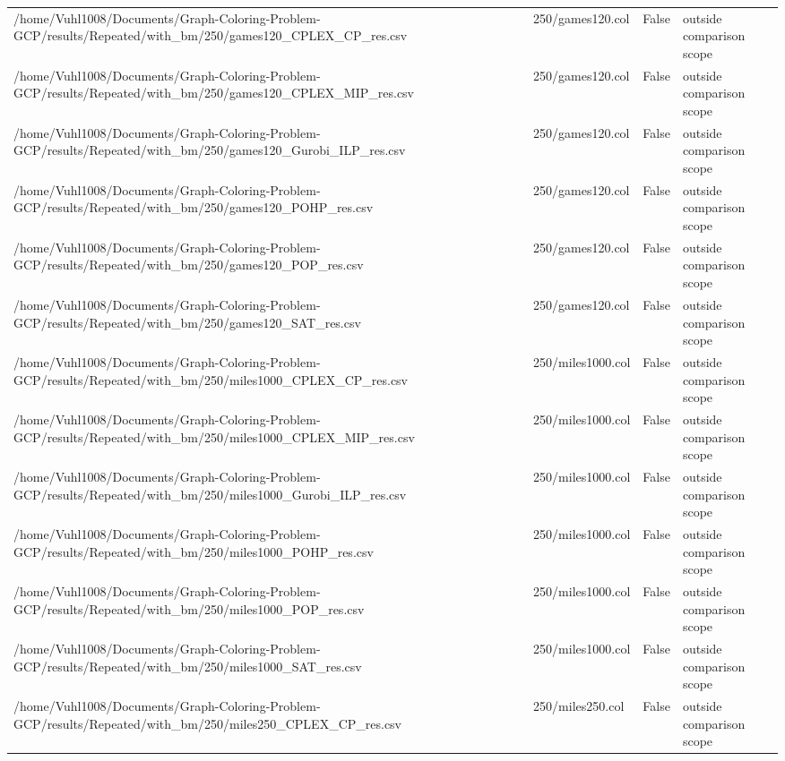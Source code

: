 \begin{table}[htbp]
\begin{tabular}{llll}
/home/Vuhl1008/Documents/Graph-Coloring-Problem-GCP/results/Repeated/with\_bm/250/games120\_CPLEX\_CP\_res.csv & 250/games120.col & False & outside comparison scope \\
/home/Vuhl1008/Documents/Graph-Coloring-Problem-GCP/results/Repeated/with\_bm/250/games120\_CPLEX\_MIP\_res.csv & 250/games120.col & False & outside comparison scope \\
/home/Vuhl1008/Documents/Graph-Coloring-Problem-GCP/results/Repeated/with\_bm/250/games120\_Gurobi\_ILP\_res.csv & 250/games120.col & False & outside comparison scope \\
/home/Vuhl1008/Documents/Graph-Coloring-Problem-GCP/results/Repeated/with\_bm/250/games120\_POHP\_res.csv & 250/games120.col & False & outside comparison scope \\
/home/Vuhl1008/Documents/Graph-Coloring-Problem-GCP/results/Repeated/with\_bm/250/games120\_POP\_res.csv & 250/games120.col & False & outside comparison scope \\
/home/Vuhl1008/Documents/Graph-Coloring-Problem-GCP/results/Repeated/with\_bm/250/games120\_SAT\_res.csv & 250/games120.col & False & outside comparison scope \\
/home/Vuhl1008/Documents/Graph-Coloring-Problem-GCP/results/Repeated/with\_bm/250/miles1000\_CPLEX\_CP\_res.csv & 250/miles1000.col & False & outside comparison scope \\
/home/Vuhl1008/Documents/Graph-Coloring-Problem-GCP/results/Repeated/with\_bm/250/miles1000\_CPLEX\_MIP\_res.csv & 250/miles1000.col & False & outside comparison scope \\
/home/Vuhl1008/Documents/Graph-Coloring-Problem-GCP/results/Repeated/with\_bm/250/miles1000\_Gurobi\_ILP\_res.csv & 250/miles1000.col & False & outside comparison scope \\
/home/Vuhl1008/Documents/Graph-Coloring-Problem-GCP/results/Repeated/with\_bm/250/miles1000\_POHP\_res.csv & 250/miles1000.col & False & outside comparison scope \\
/home/Vuhl1008/Documents/Graph-Coloring-Problem-GCP/results/Repeated/with\_bm/250/miles1000\_POP\_res.csv & 250/miles1000.col & False & outside comparison scope \\
/home/Vuhl1008/Documents/Graph-Coloring-Problem-GCP/results/Repeated/with\_bm/250/miles1000\_SAT\_res.csv & 250/miles1000.col & False & outside comparison scope \\
/home/Vuhl1008/Documents/Graph-Coloring-Problem-GCP/results/Repeated/with\_bm/250/miles250\_CPLEX\_CP\_res.csv & 250/miles250.col & False & outside comparison scope \\

\end{tabular}
\end{table}
